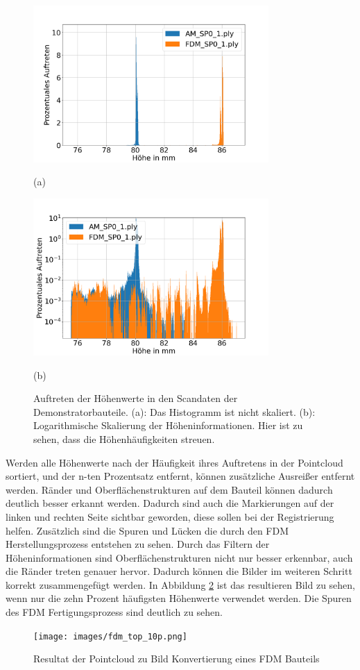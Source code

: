 \begin{figure}[H]
    \centering
    \begin{minipage}{\textwidth}
        \centering
        \includegraphics[width=0.8\textwidth]{images/height_occurange.png} %
        \caption*{(a)}
    \end{minipage}\hfill
    \begin{minipage}{\textwidth}
        \centering
        \includegraphics[width=0.8\textwidth]{images/height_occurange_log.png} %
        \caption*{(b)}
    \end{minipage}
    \caption{Auftreten der Höhenwerte in den Scandaten der Demonstratorbauteile. 
    (a): Das Histogramm ist nicht skaliert. (b): Logarithmische Skalierung der 
    Höheninformationen. Hier ist zu sehen, dass die Höhenhäufigkeiten streuen.}
    \label{fig:brightness}
\end{figure}

Werden alle Höhenwerte nach der Häufigkeit ihres 
Auftretens in der Pointcloud sortiert, und der n-ten Prozentsatz entfernt, können
zusätzliche Ausreißer entfernt werden.
Ränder und Oberflächenstrukturen auf dem Bauteil können dadurch deutlich besser erkannt werden. 
Dadurch sind auch die Markierungen auf der linken und rechten Seite sichtbar geworden,
diese sollen bei der Registrierung
helfen. Zusätzlich sind die Spuren und Lücken die durch den FDM 
Herstellungsprozess entstehen zu sehen.
Durch das Filtern der Höheninformationen sind Oberflächenstrukturen nicht nur besser
erkennbar, auch die Ränder treten genauer hervor. 
Dadurch können die Bilder im weiteren Schritt korrekt zusammengefügt werden.
In Abbildung \ref{fig:10p} ist das resultieren Bild zu sehen, wenn nur die zehn Prozent
häufigsten Höhenwerte verwendet werden.
Die Spuren des FDM Fertigungsprozess sind deutlich zu sehen.

\begin{figure}[H]
    \centering
    \texttt{[image: images/fdm\_top\_10p.png]}
    \caption{Resultat der Pointcloud zu Bild Konvertierung eines FDM Bauteils}
    \label{fig:10p}
\end{figure}
